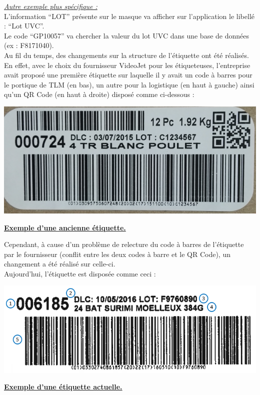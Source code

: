 \documentclass[a4paper,12pt]{extarticle}
\newcommand{\espace}{\vspace{0.3cm}}
\begin{document}
\emph{\underline{Autre exemple plus spécifique :}}\\
	L'information “LOT” présente sur le masque va afficher sur l’application le libellé : “Lot UVC”.\\
	Le code “GP10057” va chercher la valeur du lot UVC dans une base de données (ex : F8171040).\\

Au fil du temps, des changements sur la structure de l’étiquette ont été réalisés. En effet, avec le choix du fournisseur VideoJet pour les étiqueteuses, l’entreprise avait proposé une première étiquette sur laquelle il y avait un code à barres pour le portique de TLM (en bas), un autre pour la logistique (en haut à gauche) ainsi qu’un QR Code (en haut à droite) disposé comme ci-dessous : \\

\centerline{\includegraphics[scale=0.6]{Img/Img_EtiqVJAvant.PNG}}
\centerline{\textbf{\underline{Exemple d’une ancienne étiquette.}}}
\espace{}

Cependant, à cause d’un problème de relecture du code à barres de l’étiquette par le fournisseur (conflit entre les deux codes à barre et le QR Code), un changement a été réalisé sur celle-ci.\\
Aujourd’hui, l’étiquette est disposée comme ceci : \\

\centerline{\includegraphics[scale=0.6]{Img/Img_EtiqVJApres.PNG}}
\centerline{\textbf{\underline{Exemple d’une étiquette actuelle.}}}
\espace{}
\end{document}
